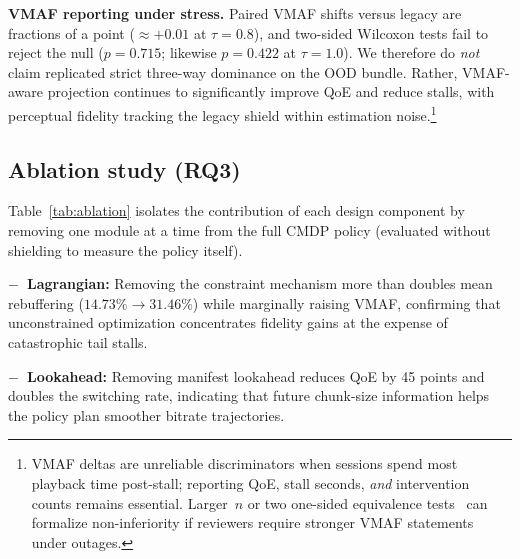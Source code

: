 \documentclass[preprint,12pt,times]{elsarticle}
\newcommand{\tablebodyfont}{\small}
\newcommand{\evaltable}[1]{%
  \begingroup\tablebodyfont
  \renewcommand{\arraystretch}{1.12}%
  \setlength{\tabcolsep}{4pt}%
  #1%
  \endgroup
}
\providecommand{\VFiveGPairedDVm}{+0.01}
\providecommand{\VFiveGPairedPVm}{0.715}
\providecommand{\VFiveGPairedPVmten}{0.422}
\begin{document}
\begin{table}[H]
    \caption{Out-of-distribution 5G/mmWave stress traces: paired Wilcoxon signed-rank tests vs.\ legacy projection ($n{=}80$).}
    \label{tab:wilcoxon:5g:stress}
    \centering
    \evaltable{}
\end{table}

\textbf{VMAF reporting under stress.} Paired VMAF shifts versus legacy are fractions of a point (\(\approx\VFiveGPairedDVm\) at \(\tau{=}0.8\)), and two-sided Wilcoxon tests fail to reject the null (\(p=\VFiveGPairedPVm\); likewise \(p=\VFiveGPairedPVmten\) at \(\tau{=}1.0\)).
We therefore do \emph{not} claim replicated strict three-way dominance on the OOD bundle.
Rather, VMAF-aware projection continues to significantly improve QoE and reduce stalls, with perceptual fidelity tracking the legacy shield within estimation noise.\footnote{VMAF deltas are unreliable discriminators when sessions spend most playback time post-stall; reporting QoE, stall seconds, \emph{and} intervention counts remains essential. Larger~\(n\) or two one-sided equivalence tests~\cite{lakens2018equivalence} can formalize non-inferiority if reviewers require stronger VMAF statements under outages.}

\subsection{Ablation study (RQ3)}

Table~\ref{tab:ablation} isolates the contribution of each design component by removing one module at a time from the full CMDP policy (evaluated without shielding to measure the policy itself).

\begin{table}[H]
    \caption{Component ablation ($n{=}80$, same traces and videos, no shield at inference). Each row removes one design component from the full CMDP policy.}
    \label{tab:ablation}
    \centering
    \evaltable{}
\end{table}

\textbf{$-$~Lagrangian:} Removing the constraint mechanism more than doubles mean rebuffering ($14.73\%\!\rightarrow\!31.46\%$) while marginally raising VMAF, confirming that unconstrained optimization concentrates fidelity gains at the expense of catastrophic tail stalls.

\textbf{$-$~Lookahead:} Removing manifest lookahead reduces QoE by 45 points and doubles the switching rate, indicating that future chunk-size information helps the policy plan smoother bitrate trajectories.
\end{document}
